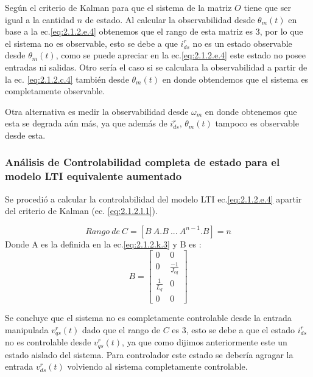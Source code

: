 \documentclass[10pt]{article}
\begin{document}
Según el criterio de Kalman para que el sistema de la matriz $O$ tiene que ser igual a la cantidad $n$ de estado. Al calcular la observabilidad desde $\theta_{m}(t)$ en base a la ec.\ref{eq:2.1.2.e.4} obtenemos que el rango de esta matriz es 3, por lo que el sistema no es observable, esto se debe a que $i^{r}_{ds}$ no es un estado observable desde $\theta_{m}(t)$, como se puede apreciar en la ec.\ref{eq:2.1.2.e.4} este estado no posee entradas ni salidas. Otro sería el caso si se calculara la observabilidad a partir de la ec. \ref{eq:2.1.2.c.4} también desde $\theta_{m}(t)$ en donde obtendemos que el sistema es completamente observable.

Otra alternativa es medir la observabilidad desde $\omega_{m}$ en donde obtenemos que esta se degrada aún más, ya que además de $i^{r}_{ds}$, $\theta_{m}(t)$ tampoco es observable desde esta. 

\subsubsection{Análisis de Controlabilidad completa de estado para el modelo LTI equivalente aumentado}
Se procedió a calcular la controlabilidad del modelo LTI ec.\ref{eq:2.1.2.e.4} apartir del criterio de Kalman (ec. \ref{eq:2.1.2.l.1}).

	\begin{equation}
		Rango \ de \ C=[B \ A.B \ ... \ A^{n-1}.B]= n
	\label{eq:2.1.2.l.1}
	\end{equation}
	Donde A es la definida en la ec.\ref{eq:2.1.2.k.3} y B es :
	\begin{equation}
		B= \begin{bmatrix}
	0 &0 \\ 
	0 &\frac{-1}{J_{eq}} \\ 
	 \frac{1}{L_{q}}&0 \\
	 0&0
	\end{bmatrix}
	\label{eq:2.1.2.l.2}
	\end{equation}
	
Se concluye que el sistema no es completamente controlable desde la entrada manipulada $v^{r}_{qs}(t)$ dado que el rango de $C$ es 3, esto se debe a que el estado $i^{r}_{ds}$ no es controlable desde $v^{r}_{qs}(t)$, ya que como dijimos anteriormente este un estado aislado del sistema. Para controlador este estado se debería agragar la entrada $v^{r}_{ds}(t)$ volviendo al sistema completamente controlable.
\end{document}
